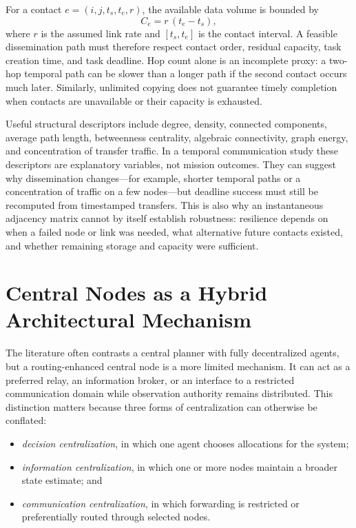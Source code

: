 For a contact $e=(i,j,t_s,t_e,r)$, the available data volume is bounded by
\begin{equation}
C_e = r\,(t_e-t_s),
\end{equation}
where $r$ is the assumed link rate and $[t_s,t_e]$ is the contact interval. A feasible dissemination path must therefore respect contact order, residual capacity, task creation time, and task deadline. Hop count alone is an incomplete proxy: a two-hop temporal path can be slower than a longer path if the second contact occurs much later. Similarly, unlimited copying does not guarantee timely completion when contacts are unavailable or their capacity is exhausted.

Useful structural descriptors include degree, density, connected components, average path length, betweenness centrality, algebraic connectivity, graph energy, and concentration of transfer traffic. In a temporal communication study these descriptors are explanatory variables, not mission outcomes. They can suggest why dissemination changes---for example, shorter temporal paths or a concentration of traffic on a few nodes---but deadline success must still be recomputed from timestamped transfers. This is also why an instantaneous adjacency matrix cannot by itself establish robustness: resilience depends on when a failed node or link was needed, what alternative future contacts existed, and whether remaining storage and capacity were sufficient.

\section{Central Nodes as a Hybrid Architectural Mechanism}

The literature often contrasts a central planner with fully decentralized agents, but a routing-enhanced central node is a more limited mechanism. It can act as a preferred relay, an information broker, or an interface to a restricted communication domain while observation authority remains distributed. This distinction matters because three forms of centralization can otherwise be conflated:

\begin{itemize}
\item \emph{decision centralization}, in which one agent chooses allocations for the system;
\item \emph{information centralization}, in which one or more nodes maintain a broader state estimate; and
\item \emph{communication centralization}, in which forwarding is restricted or preferentially routed through selected nodes.
\end{itemize}

